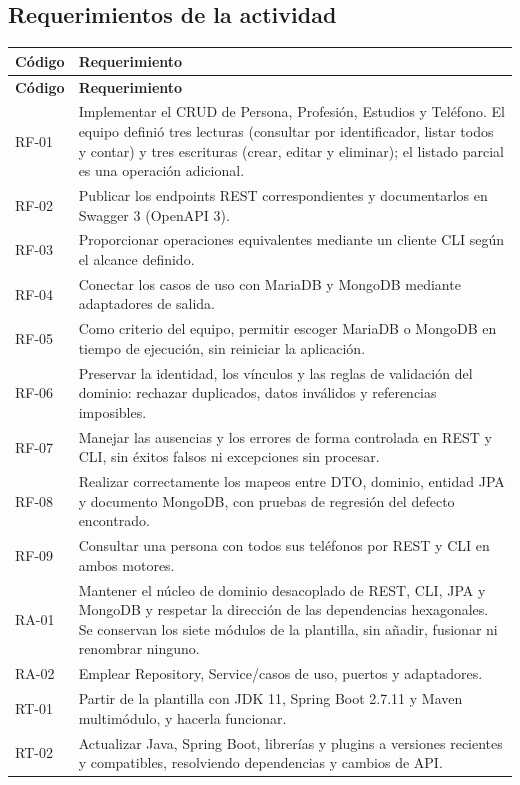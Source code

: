 \documentclass[11pt,a4paper]{article}
\begin{document}
\subsection{Requerimientos de la actividad}
\begin{longtable}{@{}p{1.8cm}p{11.9cm}@{}}
\toprule
\textbf{Código}&\textbf{Requerimiento}\\\midrule
\endfirsthead
\toprule\textbf{Código}&\textbf{Requerimiento}\\\midrule
\endhead
RF-01 & Implementar el CRUD de Persona, Profesión, Estudios y Teléfono. El equipo definió tres lecturas (consultar por identificador, listar todos y contar) y tres escrituras (crear, editar y eliminar); el listado parcial es una operación adicional.\\
RF-02 & Publicar los endpoints REST correspondientes y documentarlos en Swagger 3 (OpenAPI 3).\\
RF-03 & Proporcionar operaciones equivalentes mediante un cliente CLI según el alcance definido.\\
RF-04 & Conectar los casos de uso con MariaDB y MongoDB mediante adaptadores de salida.\\
RF-05 & Como criterio del equipo, permitir escoger MariaDB o MongoDB en tiempo de ejecución, sin reiniciar la aplicación.\\
RF-06 & Preservar la identidad, los vínculos y las reglas de validación del dominio: rechazar duplicados, datos inválidos y referencias imposibles.\\
RF-07 & Manejar las ausencias y los errores de forma controlada en REST y CLI, sin éxitos falsos ni excepciones sin procesar.\\
RF-08 & Realizar correctamente los mapeos entre DTO, dominio, entidad JPA y documento MongoDB, con pruebas de regresión del defecto encontrado.\\
RF-09 & Consultar una persona con todos sus teléfonos por REST y CLI en ambos motores.\\
RA-01 & Mantener el núcleo de dominio desacoplado de REST, CLI, JPA y MongoDB y respetar la dirección de las dependencias hexagonales. Se conservan los siete módulos de la plantilla, sin añadir, fusionar ni renombrar ninguno.\\
RA-02 & Emplear Repository, Service/casos de uso, puertos y adaptadores.\\
RT-01 & Partir de la plantilla con JDK 11, Spring Boot 2.7.11 y Maven multimódulo, y hacerla funcionar.\\
RT-02 & Actualizar Java, Spring Boot, librerías y plugins a versiones recientes y compatibles, resolviendo dependencias y cambios de API.\\

\end{longtable}
\end{document}
